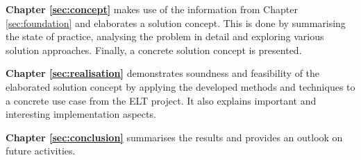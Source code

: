 \textbf{Chapter \ref{sec:concept}} makes use of the information from Chapter \ref{sec:foundation}
and elaborates a solution concept. This is done by summarising the state of practice,
analysing the problem in detail and exploring various solution approaches. Finally, a concrete
solution concept is presented.

\textbf{Chapter \ref{sec:realisation}} demonstrates soundness and feasibility of the elaborated
solution concept by applying the developed methods and techniques to a concrete use case from
the \gls{ELT} project. It also explains important and interesting implementation aspects.

\textbf{Chapter \ref{sec:conclusion}} summarises the results and provides an outlook on future
activities.

\cite{Apel:2013}